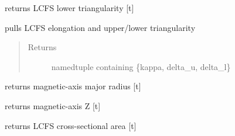 \documentclass[letterpaper,10pt,english]{sphinxmanual}
\begin{document}
\begin{fulllineitems}
\begin{fulllineitems}
\end{fulllineitems}


\begin{fulllineitems}
\label{eqtools:eqtools.EFIT.EFITTree.getLowerTriangularity}
returns LCFS lower triangularity {[}t{]}

\end{fulllineitems}


\begin{fulllineitems}
\label{eqtools:eqtools.EFIT.EFITTree.getSlhaping}
pulls LCFS elongation and upper/lower triangularity
\begin{quote}\begin{description}
\item[{Returns}] \leavevmode
namedtuple containing \{kappa, delta\_u, delta\_l\}

\end{description}\end{quote}

\end{fulllineitems}


\begin{fulllineitems}
\label{eqtools:eqtools.EFIT.EFITTree.getMagR}
returns magnetic-axis major radius {[}t{]}

\end{fulllineitems}


\begin{fulllineitems}
\label{eqtools:eqtools.EFIT.EFITTree.getMagZ}
returns magnetic-axis Z {[}t{]}

\end{fulllineitems}


\begin{fulllineitems}
\label{eqtools:eqtools.EFIT.EFITTree.getAreaLCFS}
returns LCFS cross-sectional area {[}t{]}


\end{fulllineitems}
\end{fulllineitems}
\end{document}
